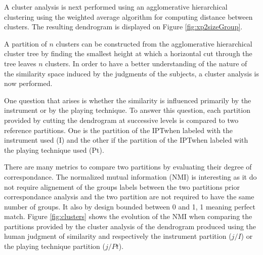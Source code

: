 \documentclass{article}
\newcommand{\ipt}{IPT}
\begin{document}
A cluster analysis is next performed using an agglomerative hierarchical clustering using the weighted average algorithm for computing distance between clusters. The resulting dendrogram is displayed on Figure \ref{fig:xp2sizeGroup}.

A partition of $n$ clusters can be constructed from the agglomerative hierarchical cluster tree by finding the smallest height at which a horizontal cut through the tree leaves $n$ clusters. In order to have a better understanding of the nature of the similarity space induced by the judgments of the subjects, a cluster analysis is now performed.

One question that arises is whether the similarity is influenced primarily by the instrument or by the playing technique. To answer this question, each partition provided by cutting the dendrogram at successive levels is compared to two reference partitions. One is the partition of the \ipt when labeled with the instrument used (I) and the other if the partition of the \ipt when labeled with the playing technique used (Pt).

There are many metrics to compare two partitions by evaluating their degree of correspondance. The normalized mutual information (NMI) is interesting as it do not require alignement of the groups labels between the two partitions prior correspondance analysis and the two partition are not required to have the same number of groups. It also by design bounded between 0 and 1, 1 meaning perfect match. Figure \ref{fig:clusters} shows the evolution of the NMI when comparing the partitions provided by the cluster analysis of the dendrogram produced using the human judgment of similarity and respectively the instrument partition ($j/I$) or the playing technique partition ($j/Pt$).
\end{document}
